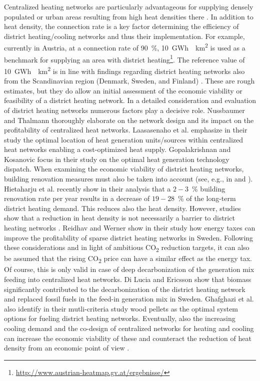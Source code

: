 Centralized heating networks are particularly advantageous for supplying densely populated or urban areas resulting from high heat densities there \cite{inage2020development}. In addition to heat density, the connection rate is a key factor determining the efficiency of district heating/cooling networks and thus their implementation. For example, currently in Austria, at a connection rate of \SI{90}{\%}, \SI{10}{GWh \per km^2} is used as a benchmark for supplying an area with district heating\footnote{\url{http://www.austrian-heatmap.gv.at/ergebnisse/}}. The reference value of \SI{10}{GWh \per km^2} is in line with findings regarding district heating networks also from the Scandinavian region (Denmark, Sweden, and Finland) \cite{zinko2008district}. These are rough estimates, but they do allow an initial assessment of the economic viability or feasibility of a district heating network. In a detailed consideration and evaluation of district heating networks numerous factors play a decisive role. Nussbaumer and Thalmann \cite{nussbaumer2016influence} thoroughly elaborate on the network design and its impact on the profitability of centralized heat networks. Laasasenaho et al. \cite{laasasenaho2019gis} emphasize in their study the optimal location of heat generation units/sources within centralized heat networks enabling a cost-optimized heat supply. Gopalakrishnan and Kosanovic \cite{gopalakrishnan2014economic} focus in their study on the optimal heat generation technology dispatch. When examining the economic viability of district heating networks, building renovation measures must also be taken into account (see, e.g., in \cite{andric2018impact} and \cite{rabani2021achieving}). Hietaharju et al. \cite{hietaharju2021stochastic} recently show in their analysis that a $2-3$\SI{}{\%} building renovation rate per year results in a decrease of $19-28$\SI{}{\%} of the long-term district heating demand. This reduces also the heat density. However, studies show that a reduction in heat density is not necessarily a barrier to district heating networks \cite{persson2011heat}. Reidhav and Werner \cite{reidhav2008profitability} show in their study how energy taxes can improve the profitability of sparse district heating networks in Sweden. Following these considerations and in light of ambitious CO\textsubscript{2} reduction targets, it can also be assumed that the rising CO\textsubscript{2} price can have a similar effect as the energy tax. Of course, this is only valid in case of deep decarbonization of the generation mix feeding into centralized heat networks. Di Lucia and Ericsson \cite{di2014low} show that biomass significantly contributed to the decarbonization of the district heating network and replaced fossil fuels in the feed-in generation mix in Sweden. Ghafghazi et al. \cite{ghafghazi2010multicriteria} also identify in their mutli-criteria study wood pellets as the optimal system options for fueling district heating networks. Eventually, also the increasing cooling demand and the co-design of centralized networks for heating and cooling can increase the economic viability of these and counteract the reduction of heat density from an economic point of view \cite{zhang2021economic}.

